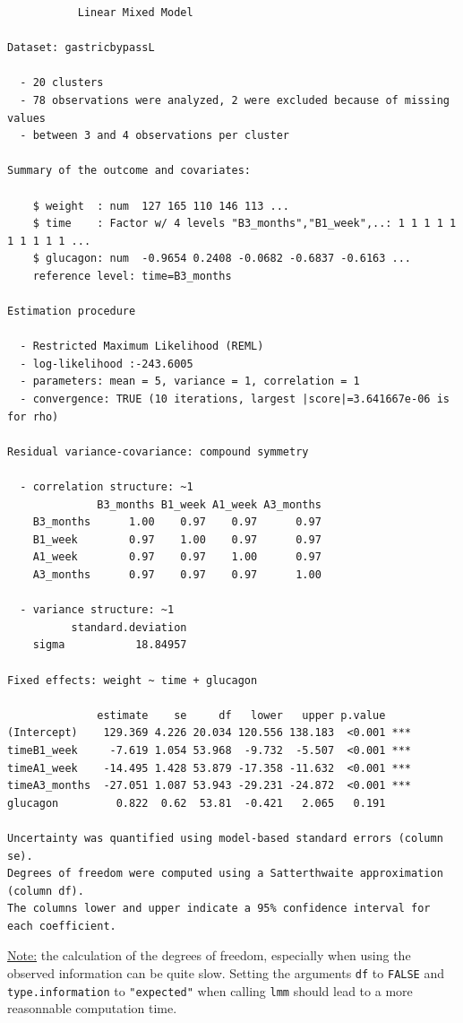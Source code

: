 \documentclass[12pt]{article}
\begin{document}
\begin{verbatim}
           Linear Mixed Model 
 
Dataset: gastricbypassL 

  - 20 clusters 
  - 78 observations were analyzed, 2 were excluded because of missing values 
  - between 3 and 4 observations per cluster 

Summary of the outcome and covariates: 

    $ weight  : num  127 165 110 146 113 ...
    $ time    : Factor w/ 4 levels "B3_months","B1_week",..: 1 1 1 1 1 1 1 1 1 1 ...
    $ glucagon: num  -0.9654 0.2408 -0.0682 -0.6837 -0.6163 ...
    reference level: time=B3_months 

Estimation procedure 

  - Restricted Maximum Likelihood (REML) 
  - log-likelihood :-243.6005
  - parameters: mean = 5, variance = 1, correlation = 1
  - convergence: TRUE (10 iterations, largest |score|=3.641667e-06 is for rho)
 
Residual variance-covariance: compound symmetry 

  - correlation structure: ~1 
              B3_months B1_week A1_week A3_months
    B3_months      1.00    0.97    0.97      0.97
    B1_week        0.97    1.00    0.97      0.97
    A1_week        0.97    0.97    1.00      0.97
    A3_months      0.97    0.97    0.97      1.00

  - variance structure: ~1 
          standard.deviation
    sigma           18.84957

Fixed effects: weight ~ time + glucagon 

              estimate    se     df   lower   upper p.value    
(Intercept)    129.369 4.226 20.034 120.556 138.183  <0.001 ***
timeB1_week     -7.619 1.054 53.968  -9.732  -5.507  <0.001 ***
timeA1_week    -14.495 1.428 53.879 -17.358 -11.632  <0.001 ***
timeA3_months  -27.051 1.087 53.943 -29.231 -24.872  <0.001 ***
glucagon         0.822  0.62  53.81  -0.421   2.065   0.191    

Uncertainty was quantified using model-based standard errors (column se). 
Degrees of freedom were computed using a Satterthwaite approximation (column df). 
The columns lower and upper indicate a 95% confidence interval for each coefficient.
\end{verbatim}

\uline{Note:} the calculation of the degrees of freedom, especially when
using the observed information can be quite slow. Setting the
arguments \texttt{df} to \texttt{FALSE} and \texttt{type.information} to \texttt{"expected"} when
calling \texttt{lmm} should lead to a more reasonnable computation time.
\end{document}
